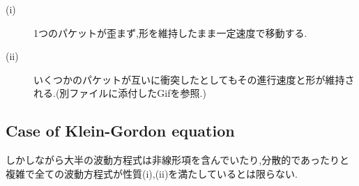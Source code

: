 \documentclass[dvipdfmx,11pt,a4paper,oneside,openany]{jsbook}
\begin{document}
\begin{screen}
    \begin{description}
        \item[(i)] 1つのパケットが歪まず,形を維持したまま一定速度で移動する.
        \item[(ii)] いくつかのパケットが互いに衝突したとしてもその進行速度と形が維持される.(別ファイルに添付したGifを参照.)
    \end{description}
\end{screen}
\begin{figure}[H]
    \centering
    \label{2-soliton}
\end{figure}

\subsection{Case of Klein-Gordon equation}
しかしながら大半の波動方程式は非線形項を含んでいたり,分散的であったりと複雑で全ての波動方程式が性質(i),(ii)を満たしているとは限らない.
\end{document}
